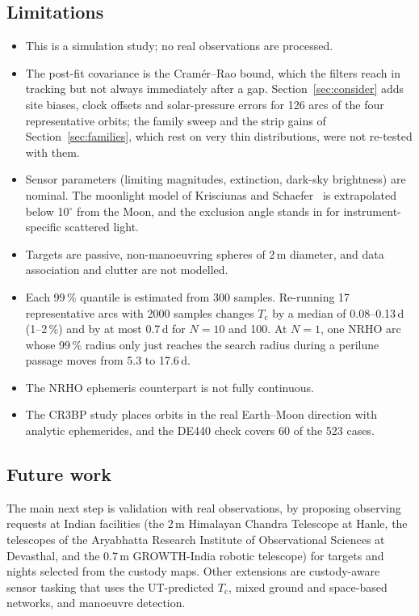 \documentclass[pdflatex,sn-mathphys-num]{sn-jnl}
\newcommand{\Tc}{T_{\mathrm{c}}}
\begin{document}
\subsection{Limitations}
\begin{itemize}
\item This is a simulation study; no real observations are processed.
\item The post-fit covariance is the Cram\'er--Rao bound, which the filters reach in tracking but
      not always immediately after a gap. Section~\ref{sec:consider} adds site biases, clock offsets
      and solar-pressure errors for 126 arcs of the four representative orbits; the family sweep and
      the strip gains of Section~\ref{sec:families}, which rest on very thin distributions, were not
      re-tested with them.
\item Sensor parameters (limiting magnitudes, extinction, dark-sky brightness) are nominal. The
      moonlight model of Krisciunas and Schaefer~\cite{krisciunas1991} is extrapolated below
      10$^\circ$ from the Moon, and the exclusion angle stands in for instrument-specific scattered
      light.
\item Targets are passive, non-manoeuvring spheres of 2\,m diameter, and data association and
      clutter are not modelled.
\item Each 99\,\% quantile is estimated from 300 samples. Re-running 17 representative arcs with
      2000 samples changes $\Tc$ by a median of 0.08--0.13\,d (1--2\,\%) and by at most 0.7\,d for
      $N = 10$ and 100. At $N = 1$, one NRHO arc whose 99\,\% radius only just reaches the search
      radius during a perilune passage moves from 5.3 to 17.6\,d.
\item The NRHO ephemeris counterpart is not fully continuous.
\item The CR3BP study places orbits in the real Earth--Moon direction with analytic ephemerides, and
      the DE440 check covers 60 of the 523 cases.
\end{itemize}

\subsection{Future work}
The main next step is validation with real observations, by proposing observing requests at Indian
facilities (the 2\,m Himalayan Chandra Telescope at Hanle, the telescopes of the Aryabhatta Research
Institute of Observational Sciences at Devasthal, and the 0.7\,m GROWTH-India robotic telescope) for
targets and nights selected from the custody maps. Other extensions are custody-aware sensor
tasking that uses the UT-predicted $\Tc$, mixed ground and space-based networks, and manoeuvre
detection.
\end{document}
